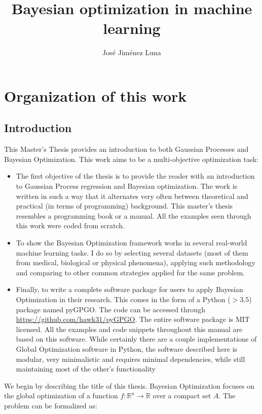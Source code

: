 \documentclass[10pt,a4paper,twoside]{book}
\begin{document}
\title{Bayesian optimization in machine learning}
\author{Jos\'e Jim\'enez Luna}
\maketitle
\tableofcontents


\chapter{Organization of this work}

\section{Introduction}

This Master's Thesis provides an introduction to both Gaussian Processes and Bayesian Optimization. This work aims to be a multi-objective optimization task:

\begin{itemize}
\item The first objective of the thesis is to provide the reader with an introduction to Gaussian Process regression and Bayesian optimization. The work is written in such a way that it alternates very often between theoretical and practical (in terms of programming) background. This master's thesis resembles a programming book or a manual. All the examples seen through this work were coded from scratch.
\item To show the Bayesian Optimization framework works in several real-world machine learning tasks. I do so by selecting several datasets (most of them from medical, biological or physical phenomena), applying such methodology and comparing to other common strategies applied for the same problem. 
\item Finally, to write a complete software package for users to apply Bayesian Optimization in their research. This comes in the form of a Python ($>$3.5) package named pyGPGO. The code can be accessed through \url{https://github.com/hawk31/pyGPGO}. The entire software package is MIT licensed. All the examples and code snippets throughout this manual are based on this software. While certainly there are a couple implementations of Global Optimization software in Python, the software described here is modular, very minimalistic and requires minimal dependencies, while still maintaining most of the other's functionality
\end{itemize}

We begin by describing the title of this thesis. Bayesian Optimization focuses on the global optimization of a function $f:\mathbb{R}^n \rightarrow \mathbb{R}$ over a compact set $A$. The problem can be formalized as:
\end{document}
